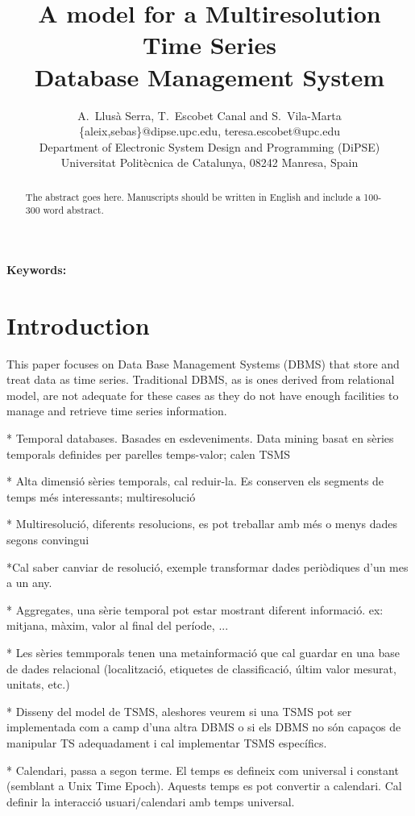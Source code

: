\documentclass[
english
]{scrartcl}
\title{
  A model for a Multiresolution Time Series\\
  Database Management System }
\author
{
  {
    A.\ Llusà Serra,
    T.\ Escobet Canal
    and S.\ Vila-Marta
  }\\
  {\{aleix,sebas\}@dipse.upc.edu, teresa.escobet@upc.edu}\\
  {Department of Electronic System Design and Programming (DiPSE)}\\
  {Universitat Politècnica de Catalunya, 08242 Manresa, Spain}
}
\begin{document}
\maketitle


\begin{abstract}
The abstract goes here.
Manuscripts should be written in English and include a 100-300 word abstract.
\end{abstract}

{\bfseries Keywords:} 



\twocolumn



\section{Introduction}

This paper focuses on Data Base Management Systems (DBMS) that store
and treat data as time series. Traditional DBMS, as is ones derived
from relational model, are not adequate for these cases as they do not
have enough facilities to manage and retrieve time series
information.



* Temporal databases. Basades en esdeveniments. Data mining basat en sèries temporals definides per parelles temps-valor; calen TSMS

* Alta dimensió sèries temporals, cal reduir-la. Es conserven els segments de temps més interessants; multiresolució

* Multiresolució, diferents resolucions, es pot treballar amb més o menys dades segons convingui

*Cal saber canviar de resolució, exemple transformar dades periòdiques d'un mes a un any.

* Aggregates, una sèrie temporal pot estar mostrant diferent informació. ex: mitjana, màxim, valor al final del període, ...

* Les sèries temmporals tenen una metainformació que cal guardar en una base de dades relacional (localització, etiquetes de classificació, últim valor mesurat, unitats, etc.)

* Disseny del model de TSMS, aleshores veurem si una TSMS pot ser implementada com a camp d'una altra DBMS o si els DBMS no són capaços de manipular TS adequadament i cal implementar TSMS específics.

* Calendari, passa a segon terme. El temps es defineix com universal i constant (semblant a Unix Time Epoch). Aquests temps es pot convertir a calendari. Cal definir la interacció usuari/calendari amb temps universal.
\end{document}
